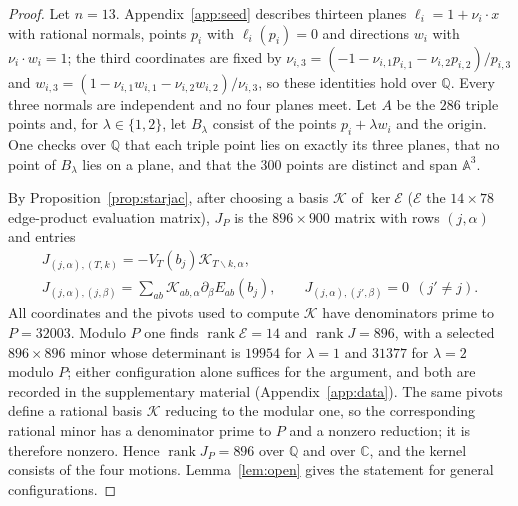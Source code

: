 \documentclass{amsart}
\theoremstyle{definition}
\theoremstyle{remark}
\numberwithin{equation}{section}
\newcommand{\CC}{\mathbb{C}}
\newcommand{\A}{\mathbb{A}}
\newcommand{\QQ}{\mathbb{Q}}
\DeclareMathOperator{\rank}{rank}
\begin{document}
\begin{proof}
Let $n=13$. Appendix~\ref{app:seed} describes thirteen planes
$\ell_i=1+\nu_i\cdot x$ with rational normals, points $p_i$ with $\ell_i(p_i)=0$ and
directions $w_i$ with $\nu_i\cdot w_i=1$; the third coordinates are fixed by
$\nu_{i,3}=(-1-\nu_{i,1}p_{i,1}-\nu_{i,2}p_{i,2})/p_{i,3}$ and
$w_{i,3}=(1-\nu_{i,1}w_{i,1}-\nu_{i,2}w_{i,2})/\nu_{i,3}$, so these identities hold
over $\QQ$. Every three normals are independent and no four planes meet. Let $A$ be the
$286$ triple points and, for $\lambda\in\{1,2\}$, let $B_\lambda$ consist of the
points $p_i+\lambda w_i$ and the origin. One checks over $\QQ$ that each triple point
lies on exactly its three planes, that no point of $B_\lambda$ lies on a plane, and
that the $300$ points are distinct and span $\A^3$.

By Proposition~\ref{prop:starjac}, after choosing a basis $\mathcal K$ of
$\ker\mathcal E$ ($\mathcal E$ the $14\times78$ edge-product evaluation matrix), $J_P$
is the $896\times900$ matrix with rows $(j,\alpha)$ and entries
\begin{gather*}
  J_{(j,\alpha),(T,k)}=-V_T(b_j)\mathcal K_{T\smallsetminus k,\alpha},\\
  J_{(j,\alpha),(j,\beta)}=\sum_{ab}\mathcal K_{ab,\alpha}\partial_\beta E_{ab}(b_j),
  \qquad J_{(j,\alpha),(j',\beta)}=0\ \ (j'\ne j).
\end{gather*}
All coordinates and the pivots used to compute $\mathcal K$ have denominators prime to
$P=32003$. Modulo $P$ one finds $\rank\mathcal E=14$ and $\rank J=896$, with a selected
$896\times896$ minor whose determinant is $19954$ for $\lambda=1$ and $31377$ for
$\lambda=2$ modulo $P$; either configuration alone suffices for the argument, and both
are recorded in the supplementary material (Appendix~\ref{app:data}). The same pivots define a rational basis
$\mathcal K$ reducing to the
modular one, so the corresponding rational minor has a denominator prime to $P$ and a
nonzero reduction; it is therefore nonzero. Hence $\rank J_P=896$ over $\QQ$ and over
$\CC$, and the kernel consists of the four motions. Lemma~\ref{lem:open} gives the
statement for general configurations.
\end{proof}
\end{document}
